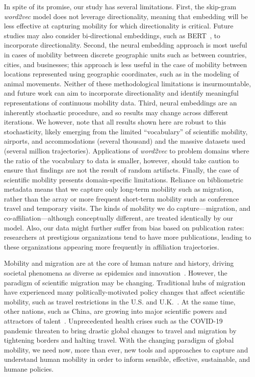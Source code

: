 \documentclass[12pt]{article} %
\begin{document}
In spite of its promise, our study has several limitations.
First, the skip-gram \textit{word2vec} model does not leverage directionality, meaning that embedding will be less effective at capturing mobility for which directionality is critical.
Future studies may also consider bi-directional embeddings, such as BERT~\autocite{devlin2018bert}, to incorporate directionality.
Second, the neural embedding approach is most useful in cases of mobility between discrete geographic units such as between countries, cities, and businesses; this approach is less useful in the case of mobility between locations represented using geographic coordinates, such as in the modeling of animal movements.
Neither of these methodological limitations is insurmountable, and future work can aim to incorporate directionality and identify meaningful representations of continuous mobility data.
Third, neural embeddings are an inherently stochastic procedure, and so results may change across different iterations.
We however, note that all results shown here are robust to this stochasticity, likely emerging from the limited ``vocabulary'' of scientific mobility, airports, and accommodations (several thousand) and the massive datasets used (several million trajectories).
Applications of \textit{word2vec }to problem domains where the ratio of the vocabulary to data is smaller, however, should take caution to ensure that findings are not the result of random artifacts.
Finally, the case of scientific mobility presents domain-specific limitations.
Reliance on bibliometric metadata means that we capture only long-term mobility such as migration, rather than the array or more frequent short-term mobility such as conference travel and temporary visits.
The kinds of mobility we do capture---migration, and co-affiliation---although conceptually different, are treated identically by our model.
Also, our data might further suffer from bias based on publication rates: researchers at prestigious organizations tend to have more publications, leading to these organizations appearing more frequently in affiliation trajectories.


Mobility and migration are at the core of human nature and history, driving societal phenomena as diverse as epidemics\autocite{kraemer2020covid, truscott2012epidemicgravity} and innovation~\autocite{kaiser2018innovation, sugimoto2017mostimpact, petersen2018multiscale, morgan2018prestige, rodrigues2016mobility}.
However, the paradigm of scientific migration may be changing.
Traditional hubs of migration have experienced many politically-motivated policy changes that affect scientific mobility, such as travel restrictions in the U.S. and U.K.~\autocite{chinchilla2018travelban}.
At the same time, other nations, such as China, are growing into major scientific powers and attractors of talent~\autocite{cao2020returning}.
Unprecedented health crises such as the COVID-19 pandemic threaten to bring drastic global changes to travel and migration by tightening borders and halting travel.
With the changing paradigm of global mobility, we need now, more than ever, new tools and approaches to capture and understand human mobility in order to inform sensible, effective, sustainable, and humane policies.
\end{document}
